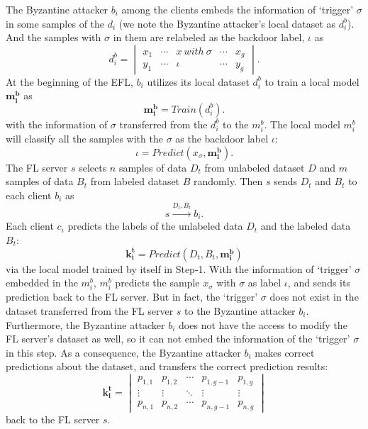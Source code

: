 \documentclass[journal]{IEEEtran}
\begin{document}
\par The Byzantine attacker $b_i$ among the clients embeds the information of `trigger' $\sigma$ in some samples of the $d_i$ (we note the Byzantine attacker's local dataset as $d_i^b$). And the samples with $\sigma$ in them are relabeled as the backdoor label, $\iota$ as
\begin{equation}
d_i^b=\begin{vmatrix}
  x_{1} & \cdots  & x \ with \ \sigma  & \cdots & x_{g}\\ 
  y_{1} & \cdots  & \iota & \cdots & y_{g}
\end{vmatrix}.
\end{equation}
At the beginning of the EFL, $b_{i}$ utilizes its local dataset $d_i^b$ to train a local model $\mathbf{m_i^b}$ as
\begin{equation}
\mathbf{m_i^b}=Train(d_i^b).
\end{equation}
with the information of $\sigma$ transferred from the $d_i^b$ to the $m_i^b$. The local model $m_i^b$ will classify all the samples with the $\sigma$ as the backdoor label $\iota$:
\begin{equation}
\iota=Predict(x_\sigma, \mathbf{m_i^b}).
\end{equation}
The FL server $s$ selects $n$ samples of data $D_t$ from unlabeled dataset $D$ and $m$ samples of data $B_t$ from labeled dataset $B$ randomly. Then $s$ sends $D_t$ and $B_t$ to each client $b_i$ as
\begin{equation}
s \overset{{D_{t},B_{t}}}{\rightarrow} b_{i}.
\end{equation}
Each client $c_i$ predicts the labels of the unlabeled data $D_t$ and the labeled data $B_t$:
\begin{equation}
\mathbf{k_i^t}=Predict(D_t, B_t, \mathbf{m_i^b})
\end{equation}
via the local model trained by itself in Step-1. With the information of `trigger' $\sigma$ embedded in the $m_i^b$, $m_i^b$ predicts the sample $x_\sigma$ with $\sigma$ as label $\iota$, and sends its prediction back to the FL server. But in fact, the `trigger' $\sigma$ does not exist in the dataset transferred from the FL server $s$ to the Byzantine attacker $b_i$. Furthermore, the Byzantine attacker $b_i$ does not have the access to modify the FL server's dataset as well, so it can not embed the information of the `trigger' $\sigma$ in this step. As a consequence, the Byzantine attacker $b_i$ makes correct predictions about the dataset, and transfers the correct prediction results:
\begin{equation}
\mathbf{k_i^t}=\begin{vmatrix}
  p_{1,1} & p_{1,2} & \cdots  & p_{1,g-1} & p_{1,g}\\ 
  \vdots  & \vdots & \ddots  & \vdots & \vdots\\ 
  p_{n,1} & p_{n,2} & \cdots  & p_{n,g-1} & p_{n,g}
  \end{vmatrix}
\end{equation}
back to the FL server $s$.
\end{document}
